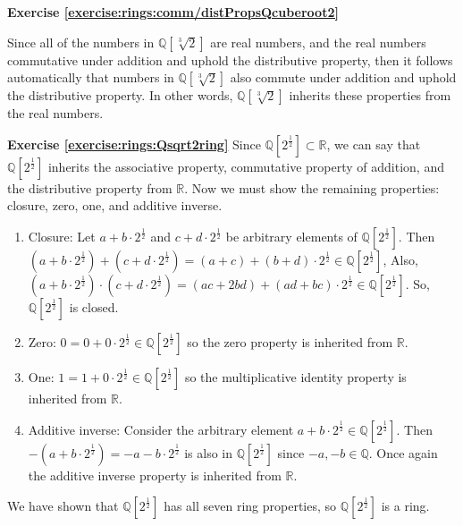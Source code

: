 \noindent\textbf{Exercise \ref{exercise:rings:comm/distPropsQcuberoot2}}

Since all of the numbers in ${\mathbb Q}[\sqrt[3]{2}]$ are real numbers, and the real numbers commutative under addition and uphold the distributive property, then it follows automatically that numbers in ${\mathbb Q}[\sqrt[3]{2}]$ also commute under addition and uphold the distributive property.  In other words, ${\mathbb Q}[\sqrt[3]{2}]$ inherits these properties from the real numbers.

\noindent\textbf{Exercise \ref{exercise:rings:Qsqrt2ring}}
Since ${\mathbb Q}[2^\frac{1}{2}]\subset{\mathbb R}$, we can say that ${\mathbb Q}[2^\frac{1}{2}]$ inherits the associative property, commutative property of addition, and the distributive property from ${\mathbb R}$.  Now we must show the remaining properties:  closure, zero, one, and additive inverse.
\begin{enumerate}
    \item Closure:  Let $a+b\cdot 2^\frac{1}{2}$ and $c+d\cdot 2^\frac{1}{2}$ be arbitrary elements of ${\mathbb Q}[2^\frac{1}{2}]$.  Then $(a+b\cdot 2^\frac{1}{2})+(c+d\cdot 2^\frac{1}{2})=(a+c)+(b+d)\cdot 2^\frac{1}{2}\in{\mathbb Q}[2^\frac{1}{2}]$,  Also, $(a+b\cdot 2^\frac{1}{2})\cdot (c+d\cdot 2^\frac{1}{2})=(ac+2bd)+(ad+bc)\cdot 2^\frac{1}{2}\in{\mathbb Q}[2^\frac{1}{2}]$.  So, ${\mathbb Q}[2^\frac{1}{2}]$ is closed.
    \item Zero:  $0=0+0\cdot 2^\frac{1}{2}\in{\mathbb Q}[2^\frac{1}{2}]$ so the zero property is inherited from ${\mathbb R}$.
    \item One:  $1=1+0\cdot 2^\frac{1}{2}\in{\mathbb Q}[2^\frac{1}{2}]$ so the multiplicative identity property is inherited from ${\mathbb R}$.
    \item Additive inverse:  Consider the arbitrary element $a+b\cdot 2^\frac{1}{2}\in{\mathbb Q}[2^\frac{1}{2}]$.  Then $-(a+b\cdot 2^\frac{1}{2})=-a-b\cdot 2^\frac{1}{2}$ is also in ${\mathbb Q}[2^\frac{1}{2}]$  since $-a,-b\in{\mathbb Q}$.  Once again the additive inverse property is inherited from ${\mathbb R}$.
\end{enumerate}
We have shown that ${\mathbb Q}[2^\frac{1}{2}]$ has all seven ring properties, so ${\mathbb Q}[2^\frac{1}{2}]$ is a ring.

